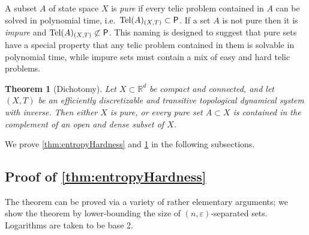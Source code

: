 \documentclass{amsart}
\theoremstyle{theorem}
\newtheorem{theorem}{Theorem}[section]
\theoremstyle{remark}
\numberwithin{equation}{section}
\DeclareMathOperator{\Tel}{Tel}
\newcommand{\RR}{\mathbb{R}}
\newcommand{\ccP}{\textsf{\upshape P}}
\begin{document}
A subset $A$ of state space $X$ is \emph{pure} if every telic problem contained in $A$ can be solved in polynomial time, i.e.\ $\Tel(A)_{(X, T)} \subset \ccP$. If a set $A$ is not pure then it is \emph{impure} and $\Tel(A)_{(X, T)} \not\subset \ccP$.
This naming is designed to suggest that pure sets have a special property that any telic problem contained in them is solvable in polynomial time, while impure sets must contain a mix of easy and hard telic problems.

\begin{theorem}[Dichotomy]\label{thmTopDichotomy}
Let $X \subset \RR^d$ be compact and connected, and let $(X, T)$ be an efficiently discretizable and transitive topological dynamical system with inverse.
Then either $X$ is pure, or every pure set $A \subset X$ is contained in the complement of an open and dense subset of $X$.
\end{theorem}

We prove \cref{thm:entropyHardness} and \cref{thmTopDichotomy} in the following subsections.

\subsection{Proof of \cref{thm:entropyHardness}}

The theorem can be proved via a variety of rather elementary arguments; we show the theorem by lower-bounding the size of $(n,\varepsilon)$-separated sets. Logarithms are taken to be base 2.
\end{document}
